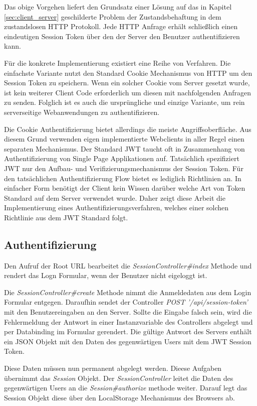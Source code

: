 Das obige Vorgehen liefert den Grundsatz einer Lösung auf das in Kapitel \ref{sec:client_server} geschilderte Problem der Zustandsbehaftung in dem zustandslosen HTTP Protokoll.
Jede HTTP Anfrage erhält schließlich einen eindeutigen Session Token über den der Server den Benutzer authentifizieren kann. 

Für die konkrete Implementierung existiert eine Reihe von Verfahren. Die einfachste Variante nutzt den Standard Cookie Mechanismus von HTTP um den Session Token zu speichern. Wenn ein solcher Cookie vom Server gesetzt wurde, ist kein weiterer Client Code erforderlich um diesen mit nachfolgenden Anfragen zu senden. Folglich ist es auch die ursprüngliche und einzige Variante, um rein serverseitige Webanwendungen zu authentifizieren.

Die Cookie Authentifizierung bietet allerdings die meiste Angriffsoberfläche. Aus diesem Grund verwenden eigen implementierte Webclients in aller Regel einen separaten Mechanismus. Der Standard JWT taucht oft in Zusammenhang von Authentifizierung von Single Page Applikationen auf.
Tatsächlich spezifiziert JWT nur den Aufbau- und Verifizierungsmechanismus der Session Token. 
Für den tatsächlichen Authentifizierung Flow bietet es lediglich Richtlinien an. In einfacher Form benötigt der Client kein Wissen darüber welche Art von Token Standard auf dem Server verwendet wurde. Daher zeigt diese Arbeit die Implementierung eines Authentifizierungsverfahren, welches einer solchen Richtlinie aus dem JWT Standard folgt. 

\subsection{Authentifizierung}

Den Aufruf der Root URL bearbeitet die \textit{SessionController\#index} Methode und rendert das Logn Formular, wenn der Benutzer nicht eigeloggt ist.

Die \textit{SessionController\#create} Methode nimmt die Anmeldedaten aus dem Login Formular entgegen. Daraufhin sendet der Controller \textit{POST '/api/session-token'} mit den Benutzereingaben an den Server. Sollte die Eingabe falsch sein, wird die Fehlermeldung der Antwort in einer Instanzvariable des Controllers abgelegt und per Databinding im Formular gerendert. Die gültige Antwort des Servers enthält ein JSON Objekt mit den Daten des gegenwärtigen Users mit dem JWT Session Token. 

Diese Daten müssen nun permanent abgelegt werden. Dieese Aufgaben übernimmt das \textit{Session} Objekt. Der \textit{SessionController} leitet die Daten des gegenwärtigen Users an die \textit{Session\#authorize} methode weiter. Darauf legt das Session Objekt diese über den \gls{LocalStorage} Mechanismus des Browsers ab. 

